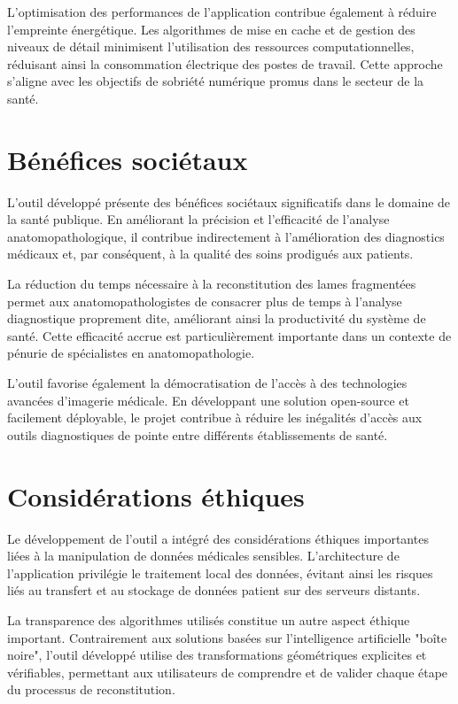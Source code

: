 \documentclass[12pt,a4paper]{report}
\begin{document}
\begin{}
\begin{}
\begin{}
\begin{}
L'optimisation des performances de l'application contribue également à réduire l'empreinte énergétique. Les algorithmes de mise en cache et de gestion des niveaux de détail minimisent l'utilisation des ressources computationnelles, réduisant ainsi la consommation électrique des postes de travail. Cette approche s'aligne avec les objectifs de sobriété numérique promus dans le secteur de la santé.

\section{Bénéfices sociétaux}

L'outil développé présente des bénéfices sociétaux significatifs dans le domaine de la santé publique. En améliorant la précision et l'efficacité de l'analyse anatomopathologique, il contribue indirectement à l'amélioration des diagnostics médicaux et, par conséquent, à la qualité des soins prodigués aux patients.

La réduction du temps nécessaire à la reconstitution des lames fragmentées permet aux anatomopathologistes de consacrer plus de temps à l'analyse diagnostique proprement dite, améliorant ainsi la productivité du système de santé. Cette efficacité accrue est particulièrement importante dans un contexte de pénurie de spécialistes en anatomopathologie.

L'outil favorise également la démocratisation de l'accès à des technologies avancées d'imagerie médicale. En développant une solution open-source et facilement déployable, le projet contribue à réduire les inégalités d'accès aux outils diagnostiques de pointe entre différents établissements de santé.

\section{Considérations éthiques}

Le développement de l'outil a intégré des considérations éthiques importantes liées à la manipulation de données médicales sensibles. L'architecture de l'application privilégie le traitement local des données, évitant ainsi les risques liés au transfert et au stockage de données patient sur des serveurs distants.

La transparence des algorithmes utilisés constitue un autre aspect éthique important. Contrairement aux solutions basées sur l'intelligence artificielle "boîte noire", l'outil développé utilise des transformations géométriques explicites et vérifiables, permettant aux utilisateurs de comprendre et de valider chaque étape du processus de reconstitution.


\end{}
\end{}
\end{}
\end{}
\end{document}

